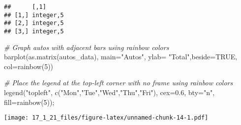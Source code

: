 \documentclass[
]{article}
\newenvironment{Shaded}{\begin{snugshade}}{\end{snugshade}}
\newcommand{\AttributeTok}[1]{\textcolor[rgb]{0.77,0.63,0.00}{#1}}
\newcommand{\CommentTok}[1]{\textcolor[rgb]{0.56,0.35,0.01}{\textit{#1}}}
\newcommand{\ConstantTok}[1]{\textcolor[rgb]{0.00,0.00,0.00}{#1}}
\newcommand{\DecValTok}[1]{\textcolor[rgb]{0.00,0.00,0.81}{#1}}
\newcommand{\FloatTok}[1]{\textcolor[rgb]{0.00,0.00,0.81}{#1}}
\newcommand{\FunctionTok}[1]{\textcolor[rgb]{0.00,0.00,0.00}{#1}}
\newcommand{\NormalTok}[1]{#1}
\newcommand{\StringTok}[1]{\textcolor[rgb]{0.31,0.60,0.02}{#1}}
\begin{document}
\begin{verbatim}
##      [,1]     
## [1,] integer,5
## [2,] integer,5
## [3,] integer,5
\end{verbatim}

\begin{Shaded}
\begin{Highlighting}[]
\CommentTok{\# Graph autos with adjacent bars using rainbow colors}
\FunctionTok{barplot}\NormalTok{(}\FunctionTok{as.matrix}\NormalTok{(autos\_data), }\AttributeTok{main=}\StringTok{"Autos"}\NormalTok{, }\AttributeTok{ylab=} \StringTok{"Total"}\NormalTok{,}\AttributeTok{beside=}\ConstantTok{TRUE}\NormalTok{, }\AttributeTok{col=}\FunctionTok{rainbow}\NormalTok{(}\DecValTok{5}\NormalTok{))}

\CommentTok{\# Place the legend at the top{-}left corner with no frame using rainbow colors}
\FunctionTok{legend}\NormalTok{(}\StringTok{"topleft"}\NormalTok{, }\FunctionTok{c}\NormalTok{(}\StringTok{"Mon"}\NormalTok{,}\StringTok{"Tue"}\NormalTok{,}\StringTok{"Wed"}\NormalTok{,}\StringTok{"Thu"}\NormalTok{,}\StringTok{"Fri"}\NormalTok{), }\AttributeTok{cex=}\FloatTok{0.6}\NormalTok{, }\AttributeTok{bty=}\StringTok{"n"}\NormalTok{, }\AttributeTok{fill=}\FunctionTok{rainbow}\NormalTok{(}\DecValTok{5}\NormalTok{));}
\end{Highlighting}
\end{Shaded}

\texttt{[image: 17\_1\_21\_files/figure-latex/unnamed-chunk-14-1.pdf]}
\end{document}
